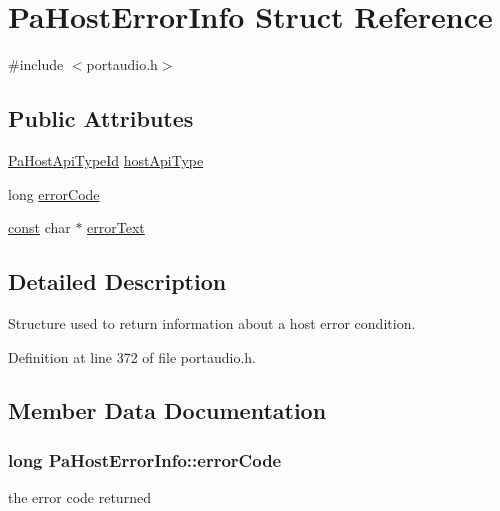 \hypertarget{struct_pa_host_error_info}{}\section{Pa\+Host\+Error\+Info Struct Reference}
\label{struct_pa_host_error_info}


{\ttfamily \#include $<$portaudio.\+h$>$}

\subsection*{Public Attributes}
\begin{DoxyCompactItemize}
\item 
\hyperlink{portaudio_8h_a8eaebe3d39c5ea45598da8f86dc2e5ae}{Pa\+Host\+Api\+Type\+Id} \hyperlink{struct_pa_host_error_info_aeadfc0e22fee75e94541876d6d7a91f7}{host\+Api\+Type}
\item 
long \hyperlink{struct_pa_host_error_info_a2ab15f358cd7f0a5e8f3d54e161a2fec}{error\+Code}
\item 
\hyperlink{getopt1_8c_a2c212835823e3c54a8ab6d95c652660e}{const} char $\ast$ \hyperlink{struct_pa_host_error_info_aa40a7ed0c73b85b39563d80f7877876c}{error\+Text}
\end{DoxyCompactItemize}


\subsection{Detailed Description}
Structure used to return information about a host error condition. 

Definition at line 372 of file portaudio.\+h.



\subsection{Member Data Documentation}
\subsubsection[{\texorpdfstring{error\+Code}{errorCode}}]{\setlength{\rightskip}{0pt plus 5cm}long Pa\+Host\+Error\+Info\+::error\+Code}\hypertarget{struct_pa_host_error_info_a2ab15f358cd7f0a5e8f3d54e161a2fec}{}\label{struct_pa_host_error_info_a2ab15f358cd7f0a5e8f3d54e161a2fec}
the error code returned 

